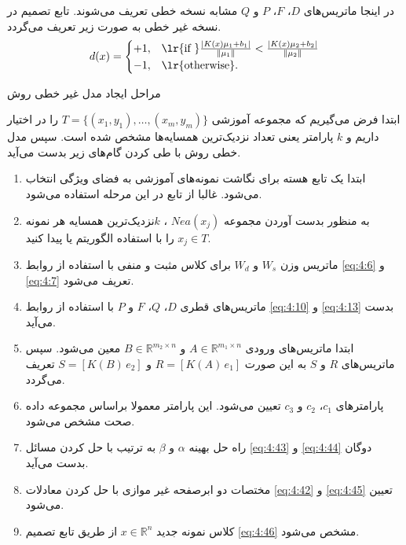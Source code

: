 در اینجا ماتریس‌های  $D$،  $F$، $P$ و $Q$ مشابه نسخه خطی تعریف می‌شوند. تابع تصمیم در نسخه غیر خطی به صورت زیر تعریف می‌گردد.
\begin{equation}\label{eq:4:46}
d(x) =
\begin{cases}
+1, & \textrm{\lr{if }} \frac{\left|{K({x})}{{\mu}_{1}}+{{b}_{1}} \right|}{\left\|\mu_1\right\|} < \frac{\left| {K({x})}{{\mu}_{2}}+{{b}_{2}} \right|}{\left\|\mu_2\right\|} \\
-1, & \textrm{\lr{otherwise}}.
\end{cases}
\end{equation}
\bigskip
\begin{algo}
	مراحل ایجاد مدل غیر خطی روش 
	
	ابتدا فرض می‌گیریم که مجموعه آموزشی $T=\{(x_1, y_1),\dots,(x_m, y_m)\}$  را در اختیار داریم و $k$ پارامتر یعنی تعداد نزدیک‌ترین همسایه‌ها مشخص شده است. سپس مدل خطی روش  با طی کردن گام‌های زیر بدست می‌آید.
	
	\begin{enumerate}
		\item ابتدا یک تابع هسته برای نگاشت نمونه‌های آموزشی به فضای ویژگی انتخاب می‌شود. غالبا از تابع  در این مرحله استفاده می‌شود.
		\item به منظور بدست آوردن مجموعه $Nea(x_{j})$ ،  $k$نزدیک‌ترین همسایه هر نمونه  $x_{j} \in T$ را با استفاده الگوریتم  یا  پیدا کنید.
		\item ماتریس وزن $W_s$  و $W_d$  برای کلاس مثبت و منفی با استفاده از روابط \ref{eq:4:6} و \ref{eq:4:7}  تعریف می‌شود.
		\item ماتریس‌های قطری  $D$،  $Q$، $F$  و $P$  با استفاده از روابط \ref{eq:4:10} و \ref{eq:4:13} بدست می‌آید.
		\item ابتدا ماتریس‌های ورودی  $A \in \mathbb{R}^{m_1 \times n}$ و   $B \in \mathbb{R}^{m_2 \times n}$ معین می‌شود. سپس ماتریس‌های  $R$  و $S$  به این صورت  $R=[K(A)\,e_{1}]$ و $S=[K(B)\,e_{2}]$ تعریف می‌گردد.
		\item پارامترهای  $c_{1}$، $c_{2}$  و $c_{3}$ تعیین می‌شود. این پارامتر معمولا براساس مجموعه داده صحت مشخص می‌شود.
		\item راه حل بهینه $\alpha$  و $\beta$  به ترتیب با حل کردن مسائل \ref{eq:4:43} و \ref{eq:4:44} دوگان بدست می‌آید.
		\item مختصات دو ابرصفحه غیر موازی با حل کردن معادلات \ref{eq:4:42} و \ref{eq:4:45} تعیین می‌شود.
		\item کلاس نمونه جدید  $x \in \mathbb{R}^{n}$ از طریق تابع تصمیم \ref{eq:4:46} مشخص می‌شود.
	\end{enumerate}
\end{algo}

